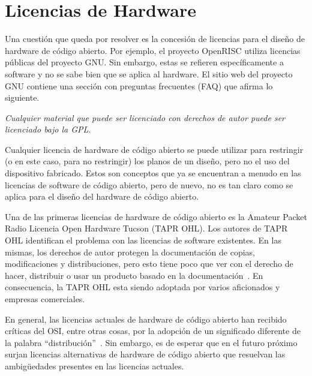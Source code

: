 \section{Licencias de Hardware}

Una cuestión que queda por resolver es la concesión de licencias
para el diseño de hardware de código abierto. Por ejemplo, el proyecto
OpenRISC utiliza licencias públicas del proyecto GNU. Sin embargo,
estas se refieren específicamente a software y no se sabe bien que se
aplica al hardware. El sitio web del proyecto GNU contiene una sección
con preguntas frecuentes (FAQ) que afirma lo siguiente.

\textit{Cualquier material que puede ser licenciado con derechos de
autor puede ser licenciado bajo la GPL}.



Cualquier licencia de hardware de código abierto se puede utilizar
para restringir (o en este caso, para no restringir) los planos de un
diseño, pero no el uso del dispositivo fabricado. Estos son conceptos
que ya se encuentran a menudo en las licencias de software de código 
abierto, pero de nuevo, no es tan claro como se aplica para el diseño
del hardware de código abierto.

Una de las primeras licencias de hardware de código abierto es la
Amateur Packet Radio Licencia Open Hardware Tucson (TAPR OHL). Los
autores de TAPR OHL identifican el problema con las licencias de
software existentes. En las mismas, los derechos de autor protegen la
documentación de copias, modificaciones y distribuciones, pero esto
tiene poco que ver con el derecho de hacer, distribuir o usar un
producto basado en la documentación~\cite{Etiqueta12}. En
consecuencia, la TAPR OHL esta siendo adoptada por varios aficionados
y empresas comerciales.

En general, las licencias actuales de hardware de código abierto han
recibido críticas del OSI, entre otras cosas, por la adopción de un
significado diferente de la palabra
``distribución''~\cite{Etiqueta13}. Sin embargo, es de esperar que en
el futuro próximo surjan licencias alternativas de hardware de código
abierto que resuelvan las ambigüedades presentes en las licencias
actuales.



